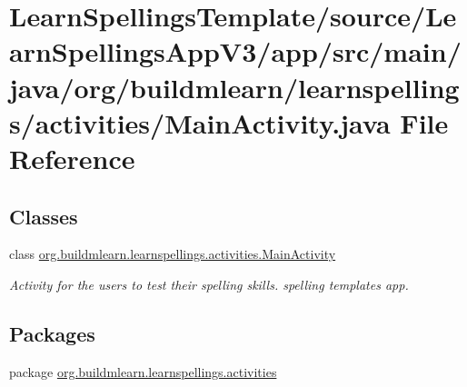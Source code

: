 \hypertarget{LearnSpellingsTemplate_2source_2LearnSpellingsAppV3_2app_2src_2main_2java_2org_2buildmlearn_2lea467f2fc2ddaf76cbe39ef028ec0293ec}{}\section{Learn\+Spellings\+Template/source/\+Learn\+Spellings\+App\+V3/app/src/main/java/org/buildmlearn/learnspellings/activities/\+Main\+Activity.java File Reference}
\label{LearnSpellingsTemplate_2source_2LearnSpellingsAppV3_2app_2src_2main_2java_2org_2buildmlearn_2lea467f2fc2ddaf76cbe39ef028ec0293ec}
\subsection*{Classes}
\begin{DoxyCompactItemize}
\item 
class \hyperlink{classorg_1_1buildmlearn_1_1learnspellings_1_1activities_1_1MainActivity}{org.\+buildmlearn.\+learnspellings.\+activities.\+Main\+Activity}
\begin{DoxyCompactList}\small\item\em Activity for the users to test their spelling skills. spelling template\textquotesingle{}s app. \end{DoxyCompactList}\end{DoxyCompactItemize}
\subsection*{Packages}
\begin{DoxyCompactItemize}
\item 
package \hyperlink{namespaceorg_1_1buildmlearn_1_1learnspellings_1_1activities}{org.\+buildmlearn.\+learnspellings.\+activities}
\end{DoxyCompactItemize}
